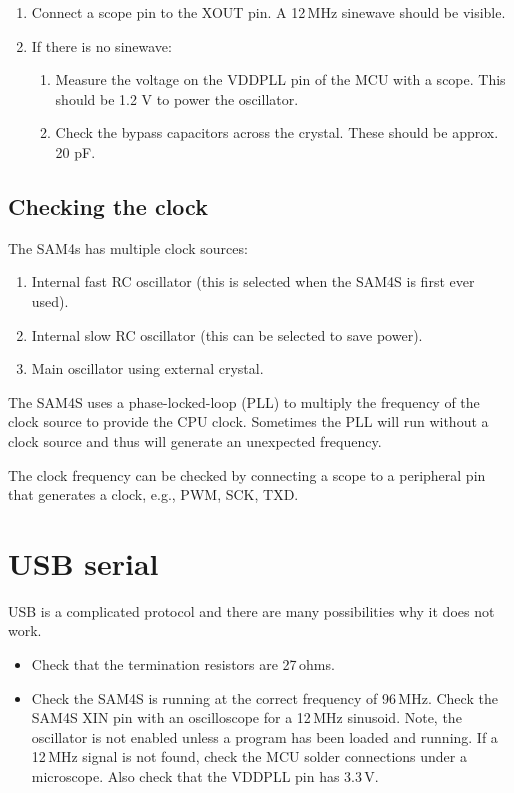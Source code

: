 
\begin{enumerate}
\item
  Connect a scope pin to the XOUT pin. A 12\,MHz sinewave should be
  visible.
\item
  If there is no sinewave:

  \begin{enumerate}
  \item
    Measure the voltage on the VDDPLL pin of the MCU with a scope. This
    should be 1.2 V to power the oscillator.
  \item
    Check the bypass capacitors across the crystal. These should be
    approx. 20 pF.
  \end{enumerate}
\end{enumerate}

\subsection{Checking the clock}
\label{checking-the-clock}

The SAM4s has multiple clock sources:

\begin{enumerate}
\item
  Internal fast RC oscillator (this is selected when the SAM4S is first
  ever used).
\item
  Internal slow RC oscillator (this can be selected to save power).
\item
  Main oscillator using external crystal.
\end{enumerate}

The SAM4S uses a phase-locked-loop (PLL) to multiply the frequency of
the clock source to provide the CPU clock. Sometimes the PLL will run
without a clock source and thus will generate an unexpected frequency.

The clock frequency can be checked by connecting a scope to a peripheral
pin that generates a clock, e.g., PWM, SCK, TXD.

\section{USB serial}
\label{debugging-usb}

USB is a complicated protocol and there are many possibilities why it
does not work.

  \begin{itemize}
  \item
    Check that the termination resistors are 27\,ohms.
    
  \item Check the SAM4S is running at the correct frequency of
    96\,MHz. Check the SAM4S XIN pin with an oscilloscope for a
    12\,MHz sinusoid. Note, the oscillator is not enabled unless a
    program has been loaded and running. If a 12\,MHz signal is not
    found, check the MCU solder connections under a microscope. Also
    check that the VDDPLL pin has 3.3\,V.
  \end{itemize}

